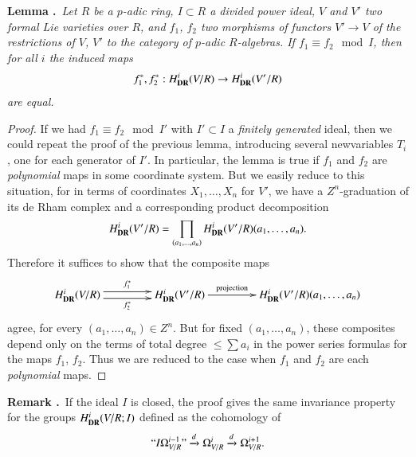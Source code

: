 \medskip
\noindent
{\bf Lemma .\label{art6-lem5.8.4}}~{\em Let $R$ be a $p$-adic ring, $I\subset R$ a divided power ideal, $V$ and $V'$ two formal Lie varieties over $R$, and $f_{1}$, $f_{2}$ two morphisms of functors $V'\to V$ of the restrictions of $V$, $V'$ to the category of $p$-adic $R$-algebras. If $f_{1}\equiv f_{2}\mod I$, then for all $i$ the induced maps}
$$
f^{*}_{1},f^{*}_{2} : H^{i}_{\mathbf{DR}}(V/R)\to H^{i}_{\mathbf{DR}}(V'/R)
$$
{\em are equal.}
\smallskip

\begin{proof}
If we had $f_{1}\equiv f_{2}\mod I'$ with $I'\subset I$ a {\em finitely generated} ideal, then we could repeat the proof of the previous lemma, introducing several new\pageoriginale variables $T_{i}$, one for each generator of $I'$. In particular, the lemma is true if $f_{1}$ and $f_{2}$ are {\em polynomial} maps in some coordinate system. But we easily reduce to this situation, for in terms of coordinates $X_{1},\ldots,X_{n}$ for $V'$, we have a $Z^{n}$-graduation of its de Rham complex and a corresponding product decomposition
$$
H^{i}_{\mathbf{DR}}(V'/R)=\prod\limits_{(a_{1},\ldots,a_{n})}H^{i}_{\mathbf{DR}}(V'/R)(a_{1},\ldots,a_{n}).
$$
Therefore it suffices to show that the composite maps
\[
\xymatrix@C=1.5cm{
H^{i}_{\DR}(V/R) \ar@<.3em>[r]^-{f^{*}_{1}} \ar@<-.3em>[r]_-{f^{*}_{2}} & H^{i}_{\DR}(V'/R)\ar[r]^-{\text{projection}} & H^{i}_{\DR}(V'/R)(a_{1},\ldots,a_{n})
}
\]
agree, for every $(a_{1},\ldots,a_{n})\in Z^{n}$. But for fixed $(a_{1},\ldots,a_{n})$, these composites depend only on the terms of total degree $\leq \sum a_{i}$ in the power series formulas for the maps $f_{1}$, $f_{2}$. Thus we are reduced to the case when $f_{1}$ and $f_{2}$ are each {\em polynomial} maps.
\end{proof}

\smallskip
\noindent
{\bf Remark .\label{art6-rem5.8.5}}~If the ideal $I$ is closed, the proof gives the same invariance property for the groups $H^{i}_{\mathbf{DR}}(V/R;I)$ defined as the cohomology of
$$
``I\Omega^{i-1}_{V/R}\text{''} \xrightarrow{d}\Omega^{i}_{V/R}\xrightarrow{d}\Omega^{i+1}_{V/R}.
$$

